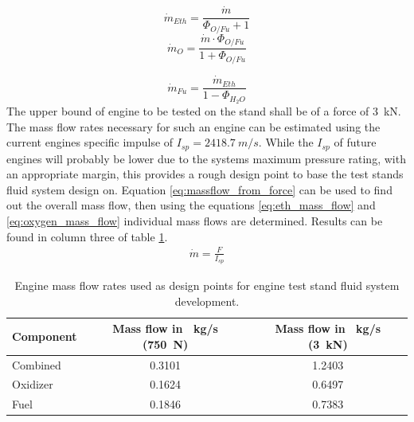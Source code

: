                 \begin{multicols}{2}
                    \begin{equation}
                        \dot{m}_{Eth} = \frac{\dot{m}}{\Phi_{O/Fu} + 1} \label{eq:eth_mass_flow}
                    \end{equation}
                    \begin{equation}
                        \dot{m}_O = \frac{\dot{m}\cdot \Phi_{O/Fu}}{1 + \Phi_{O/Fu}} \label{eq:oxygen_mass_flow} 
                    \end{equation}
                \end{multicols}
                \begin{equation}
                    \dot{m}_{Fu} = \frac{\dot{m}_{Eth}}{1 - \Phi_{H_2O}} \label{eq:fuel_mass_flow}
                \end{equation}
                The upper bound of engine to be tested on the stand shall be of a force of \qty{3}{kN}. The mass flow rates necessary for such an engine can be estimated using the current engines specific impulse of $I_{sp} = \qty{2418.7}{m/s}$. While the $I_{sp}$ of future engines will probably be lower due to the systems maximum pressure rating, with an appropriate margin, this provides a rough design point to base the test stands fluid system design on. Equation \ref{eq:massflow_from_force} can be used to find out the overall mass flow, then using the equations \ref{eq:eth_mass_flow} and \ref{eq:oxygen_mass_flow} individual mass flows are determined. Results can be found in column three of table \ref{tab:massflows}.
                \begin{align}
                    \dot{m} = \frac{F}{I_{sp}} \label{eq:massflow_from_force}
                \end{align}
                \begin{table}[h]
                \centering
                    \begin{tabular}{ |l | c | c|} 
                        \hline
                        Component & Mass flow in \qty{}{kg/s} (\qty{750}{N}) & Mass flow in \qty{}{kg/s} (\qty{3}{kN}) \\
                        \hline
                        Combined & 0.3101 & 1.2403\\
                        \hline
                        Oxidizer & 0.1624 & 0.6497\\  
                        \hline
                        Fuel & 0.1846 & 0.7383 \\
                        \hline
                    \end{tabular} 
                    \caption{Engine mass flow rates used as design points for engine test stand fluid system development.}
                    \label{tab:massflows}
                \end{table}
